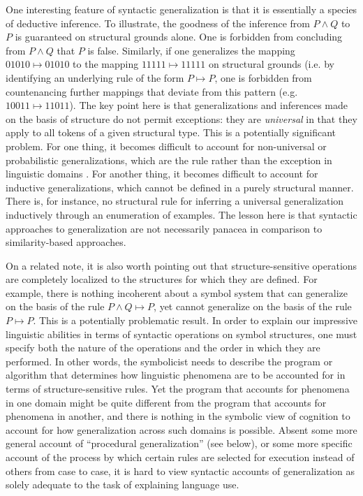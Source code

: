 One interesting feature of syntactic generalization is that it is essentially a species of deductive inference. To illustrate, the goodness of the inference from $P \land Q$ to $P$ is guaranteed on structural grounds alone. One is forbidden from concluding from $P \land Q$ that $P$ is false. Similarly, if one generalizes the mapping $01010 \mapsto 01010$ to the mapping $11111 \mapsto 11111$ on structural grounds (i.e. by identifying an underlying rule of the form $P \mapsto P$, one is forbidden from countenancing further mappings that deviate from this pattern (e.g. $10011 \mapsto 11011$). The key point here is that generalizations and inferences made on the basis of structure do not permit exceptions: they are \textit{universal} in that they apply to all tokens of a given structural type. This is a potentially significant problem. For one thing, it becomes difficult to account for non-universal or probabilistic generalizations, which are the rule rather than the exception in linguistic domains \citep{SmolenskyLegendre:2006,ChaterManning:2006,Manning:2015,Seidenberg:1997}. For another thing, it becomes difficult to account for inductive generalizations, which cannot be defined in a purely structural manner. There is, for instance, no structural rule for inferring a universal generalization inductively through an enumeration of examples. The lesson here is that syntactic approaches to generalization are not necessarily panacea in comparison to similarity-based approaches. 

On a related note, it is also worth pointing out that structure-sensitive operations are completely localized to the structures for which they are defined. For example, there is nothing incoherent about a symbol system that can generalize on the basis of the rule $P \land Q \mapsto P$, yet cannot generalize on the basis of the rule $P \mapsto P$. This is a potentially problematic result. In order to explain our impressive linguistic abilities in terms of syntactic operations on symbol structures, one must specify both the nature of the operations and the order in which they are performed. In other words, the symbolicist needs to describe the program or algorithm that determines how linguistic phenomena are to be accounted for in terms of structure-sensitive rules. Yet the program that accounts for phenomena in one domain might be quite different from the program that accounts for phenomena in another, and there is nothing in the symbolic view of cognition to account for how generalization across such domains is possible. Absent some more general account of ``procedural generalization'' (see below), or some more specific account of the process by which certain rules are selected for execution instead of others from case to case, it is hard to view syntactic accounts of generalization as solely adequate to the task of explaining language use. 

